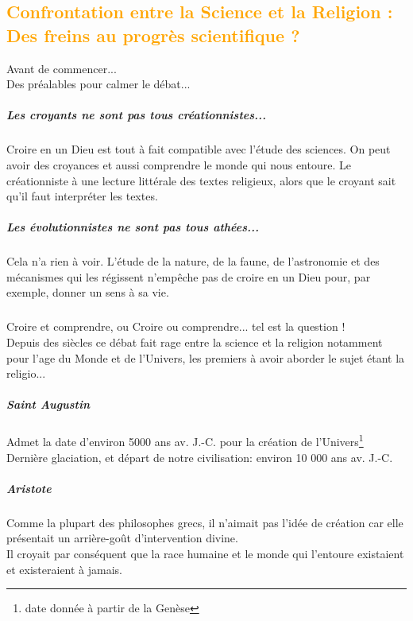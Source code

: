 \textcolor{orange}{\chapter{Confrontation entre la Science et la Religion : 
		Des freins au progrès scientifique ?}}

Avant de commencer... \\
Des préalables pour calmer le débat...\\ 

\paragraph{Les croyants ne sont pas tous créationnistes...}Croire en un Dieu est 
tout à fait compatible avec l'étude des sciences. On peut avoir des croyances et
aussi comprendre le monde qui nous entoure. Le créationniste à une lecture 
littérale des textes religieux, alors que le croyant sait qu'il faut interpréter
les textes.

\paragraph{Les évolutionnistes ne sont pas tous athées...} Cela n'a rien à voir.
L'étude de la nature, de la faune, de l'astronomie et des mécanismes qui les 
régissent n'empêche pas de croire en un Dieu pour, par exemple, donner un sens à
sa vie.

\paragraph{}Croire et comprendre, ou Croire ou comprendre... tel est la 
	question !  \\
Depuis des siècles ce débat fait rage entre la science et la religion notamment
pour l'age du Monde et de l'Univers, les premiers à avoir aborder le sujet étant 
la religio...

\paragraph{Saint Augustin}Admet la date d'environ 5000 ans av. J.-C. pour la 
création de l'Univers\footnote{date donnée à partir de la Genèse}\\
Dernière glaciation, et départ de notre civilisation: environ 10 000 ans av. 
J.-C.

\paragraph{Aristote}Comme la plupart des philosophes grecs, il n'aimait pas 
l'idée de création car elle présentait un arrière-goût d'intervention divine.
\\ Il croyait par conséquent que la race humaine et le monde qui l'entoure 
existaient et existeraient à jamais.

